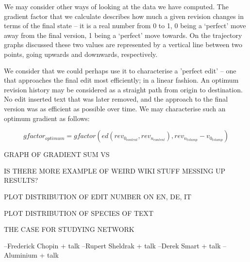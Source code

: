 We may consider other ways of looking at the data we have
computed. The gradient factor that we calculate describes how much a
given revision changes in terms of the final state -- it is a real
number from 0 to 1, 0 being a `perfect' move away from the final
version, 1 being a `perfect' move towards. On the trajectory graphs
discussed these two values are represented by a vertical line between
two points, going upwards and downwards, respectively. 

We consider that we could perhaps use it to characterise a 'perfect
edit' -- one that approaches the final edit most efficiently; in a
linear fashion. An optimum revision history may be considered as a
straight path from origin to destination. No edit inserted text that
was later removed, and the approach to the final version was as
efficient as possible over time. We may characterise such an optimum
gradient as follows:


\[
  gfactor_{optimum} = gfactor(ed(rev_{0_{content}},
  rev_{n_{content}}), rev_{n_{tstamp}} - v_{0_{tstamp}})
\]


GRAPH OF
GRADIENT SUM VS

IS THERE MORE EXAMPLE OF WEIRD WIKI STUFF MESSING UP RESULTS?

PLOT DISTRIBUTION OF EDIT NUMBER ON EN, DE, IT

PLOT DISTRIBUTION OF SPECIES OF TEXT 

THE CASE FOR STUDYING NETWORK 

--Frederick Chopin + talk
--Rupert Sheldrak + talk
--Derek Smart + talk
--Aluminium + talk

